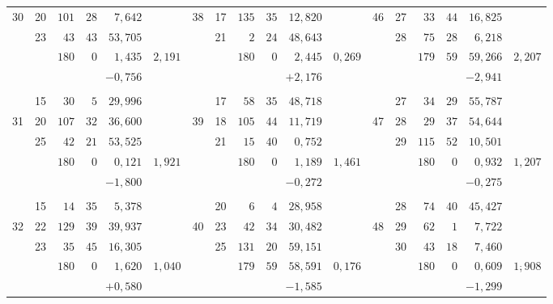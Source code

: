 \begin{center}
\begin{tabular}{|r|r|r@{\;}r@{\;}r|r||r|r|r@{\;}r@{\;}r|r||r|r|r@{\;}r@{\;}r|r|}
30 & 20 & $101$ & $28$ & $7{,}642$ &  & 38 & 17 & $135$ & $35$ & $12{,}820$ &  & 46 & 27 & $33$ & $44$ & $16{,}825$ & \\
 & 23 & $43$ & $43$ & $53{,}705$ &  &  & 21 & $2$ & $24$ & $48{,}643$ &  &  & 28 & $75$ & $28$ & $6{,}218$ & \\
\cline{3-5}\cline{9-11}\cline{15-17}
 &  & $180$ & $0$ & $1{,}435$ & $2{,}191$ &  &  & $180$ & $0$ & $2{,}445$ & $0{,}269$ &  &  & $179$ & $59$ & $59{,}266$ & $2{,}207$\\
 &  & \multicolumn{3}{r|}{$-0{,}756$} &  &  &  & \multicolumn{3}{r|}{$+2{,}176$} &  &  &  & \multicolumn{3}{r|}{$-2{,}941$} & \\
 &  &  &  &  &  &  &  &  &  &  &  &  &  &  &  &  & \\
 & 15 & $30$ & $5$ & $29{,}996$ &  &  & 17 & $58$ & $35$ & $48{,}718$ &  &  & 27 & $34$ & $29$ & $55{,}787$ & \\
31 & 20 & $107$ & $32$ & $36{,}600$ &  & 39 & 18 & $105$ & $44$ & $11{,}719$ &  & 47 & 28 & $29$ & $37$ & $54{,}644$ & \\
 & 25 & $42$ & $21$ & $53{,}525$ &  &  & 21 & $15$ & $40$ & $0{,}752$ &  &  & 29 & $115$ & $52$ & $10{,}501$ & \\
\cline{3-5}\cline{9-11}\cline{15-17}
 &  & $180$ & $0$ & $0{,}121$ & $1{,}921$ &  &  & $180$ & $0$ & $1{,}189$ & $1{,}461$ &  &  & $180$ & $0$ & $0{,}932$ & $1{,}207$\\
 &  & \multicolumn{3}{r|}{$-1{,}800$} &  &  &  & \multicolumn{3}{r|}{$-0{,}272$} &  &  &  & \multicolumn{3}{r|}{$-0{,}275$} & \\
 &  &  &  &  &  &  &  &  &  &  &  &  &  &  &  &  & \\
 & 15 & $14$ & $35$ & $5{,}378$ &  &  & 20 & $6$ & $4$ & $28{,}958$ &  &  & 28 & $74$ & $40$ & $45{,}427$ & \\
32 & 22 & $129$ & $39$ & $39{,}937$ &  & 40 & 23 & $42$ & $34$ & $30{,}482$ &  & 48 & 29 & $62$ & $1$ & $7{,}722$ & \\
 & 23 & $35$ & $45$ & $16{,}305$ &  &  & 25 & $131$ & $20$ & $59{,}151$ &  &  & 30 & $43$ & $18$ & $7{,}460$ & \\
\cline{3-5}\cline{9-11}\cline{15-17}
 &  & $180$ & $0$ & $1{,}620$ & $1{,}040$ &  &  & $179$ & $59$ & $58{,}591$ & $0{,}176$ &  &  & $180$ & $0$ & $0{,}609$ & $1\overset{\boldsymbol{\cdot}}{,}908$\\
 &  & \multicolumn{3}{r|}{$+0{,}580$} &  &  &  & \multicolumn{3}{r|}{$-1{,}585$} &  &  &  & \multicolumn{3}{r|}{$-1{,}299$} & \\

\end{tabular}
\end{center}
